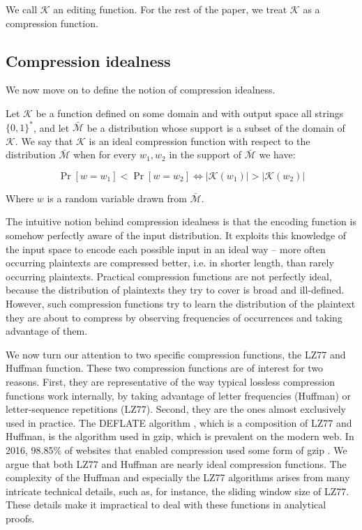 \documentclass[conference, letterpaper, 10pt]{IEEEtran}
\begin{document}
We call $\mathcal{K}$ an editing function. For the rest of the paper, we treat
$\mathcal{K}$ as a compression function.

\subsection{Compression idealness}\label{subsec:com_idealness}

We now move on to define the notion of compression idealness.

Let $\mathcal{K}$ be a function defined on some domain and with output space
all strings $\{0, 1\}^*$, and let $\bar{\mathcal{M}}$ be a distribution whose
support is a subset of the domain of $\mathcal{K}$.  We say that $\mathcal{K}$
is an ideal compression function with respect to the distribution
$\bar{\mathcal{M}}$ when for every $w_1, w_2$ in the support of
$\bar{\mathcal{M}}$ we have:

\begin{equation*}
\Pr[w = w_1] < \Pr[w = w_2] \iff \lvert\mathcal{K}(w_1)\rvert > \lvert\mathcal{K}(w_2)\rvert
\end{equation*}

Where $w$ is a random variable drawn from $\bar{\mathcal{M}}$.

The intuitive notion behind compression idealness is that the encoding
function is somehow perfectly aware of the input distribution. It
exploits this knowledge of the input space to encode each possible
input in an ideal way – more often occurring plaintexts are compressed
better, i.e. in shorter length, than rarely occurring plaintexts.
Practical compression functions are not perfectly ideal, because the
distribution of plaintexts they try to cover is broad and ill-defined.
However, such compression functions try to learn the distribution of
the plaintext they are about to compress by observing frequencies of
occurrences and taking advantage of them.

We now turn our attention to two specific compression functions, the
LZ77 and Huffman function. These two compression functions are of
interest for two reasons. First, they are representative of the way
typical lossless compression functions work internally, by taking
advantage of letter frequencies (Huffman) or letter-sequence
repetitions (LZ77). Second, they are the ones almost exclusively used in
practice. The DEFLATE algorithm \cite{c8}, which is a composition of LZ77 and
Huffman, is the algorithm used in gzip, which is prevalent on the
modern web. In 2016, 98.85\% of websites that enabled compression used
some form of gzip \cite{c7}. We argue that both LZ77 and Huffman are nearly
ideal compression functions. The complexity of the Huffman and
especially the LZ77 algorithms arises from many intricate technical
details, such as, for instance, the sliding window size of LZ77. These
details make it impractical to deal with these functions in analytical
proofs.
\end{document}
